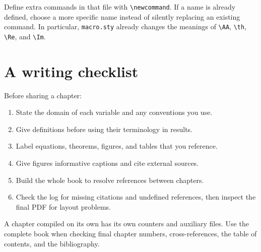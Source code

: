\documentclass[../../main.tex]{subfiles}
\begin{document}
Define extra commands in that file with \verb|\newcommand|. If a name is
already defined, choose a more specific name instead of silently replacing
an existing command. In particular, \texttt{macro.sty} already changes the
meanings of \verb|\AA|, \verb|\th|, \verb|\Re|, and \verb|\Im|.

\clearpage
\section{A writing checklist}
Before sharing a chapter:
\begin{enumerate}[label=\arabic*.]
  \item State the domain of each variable and any conventions you use.
  \item Give definitions before using their terminology in results.
  \item Label equations, theorems, figures, and tables that you reference.
  \item Give figures informative captions and cite external sources.
  \item Build the whole book to resolve references between chapters.
  \item Check the log for missing citations and undefined references, then
        inspect the final PDF for layout problems.
\end{enumerate}

\begin{note}
A chapter compiled on its own has its own counters and auxiliary files.
Use the complete book when checking final chapter numbers, cross-references,
the table of contents, and the bibliography.
\end{note}
\end{document}
